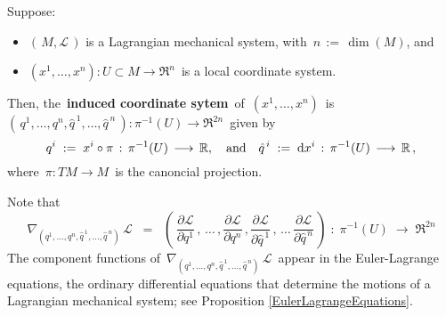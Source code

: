 \vskip 0.5cm
\begin{definition}
\mbox{}
\vskip 0.1cm
\noindent
Suppose:
\begin{itemize}
\item
	$\left(\,M,\mathscr{L}\,\right)$ is a Lagrangian mechanical system, with \,$n \,:=\, \dim(M)$, and
\item
	$(x^{1},\ldots,x^{n}) : U \subset M \longrightarrow \Re^{n}$\,
	is a local coordinate system.
\end{itemize}
Then, the \,\textbf{induced coordinate sytem}\, of \,$(x^{1},\ldots,x^{n})$\, is
\,$\left(\,q^{1},\ldots,q^{n},\hat{q}^{\,1},\ldots,\hat{q}^{\,n}\,\right) : \pi^{-1}(U) \longrightarrow \Re^{2n}$\,
given by
\begin{equation*} 
q^{i} \; := \; x^{i} \circ \pi \,:\, \pi^{-1}(U) \,\longrightarrow\, \mathbb{R},
\quad\textnormal{and}\quad
\hat{q}^{\,i} \; := \; \textnormal{d} x^{i} \,:\, \pi^{-1}(U) \,\longrightarrow\, \mathbb{R}\,,
\end{equation*}
where \,$\pi : TM \longrightarrow M$\, is the canoncial projection.
\end{definition}


\vskip 0.5cm
\begin{remark}
\mbox{}
\vskip 0.1cm
\noindent
Note that
\begin{equation*}
\nabla_{(q^{1},\ldots,q^{n},\hat{q}^{\,1},\ldots,\hat{q}^{\,n})}\,\mathscr{L}
\;\; = \;\;
	\left(\,
		\dfrac{\partial\mathscr{L}}{\partial q^{1}}\,,
		\,\ldots\,,
		\dfrac{\partial\mathscr{L}}{\partial q^{n}}\,,
		\dfrac{\partial\mathscr{L}}{\partial \hat{q}^{\,1}}\,,
		\,\ldots\,
		\dfrac{\partial\mathscr{L}}{\partial \hat{q}^{\,n}}
		\,\right)
\; : \;
	\pi^{-1}(U) \; \longrightarrow \; \Re^{2n}
\end{equation*}
The component functions of
\,$\nabla_{(q^{1},\ldots,q^{n},\hat{q}^{\,1},\ldots,\hat{q}^{\,n})}\,\mathscr{L}$\,
appear in the Euler-Lagrange equations,
the ordinary differential equations that determine the motions
of a Lagrangian mechanical system;
see Proposition \ref{EulerLagrangeEquations}.
\end{remark}


